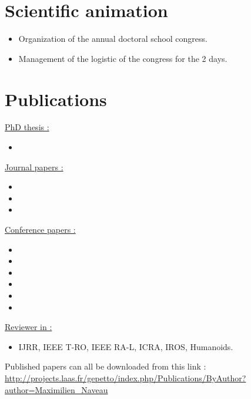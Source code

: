\documentclass[11pt,a4paper]{moderncv}
\newcommand{\items}{\item[*] \hspace{2mm}}
\begin{document}

\section{Scientific animation}

{
\begin{itemize}
\items Organization of the annual doctoral school congress.
\items Management of the logistic of the congress for the 2 days.
\end{itemize}
}


\section{Publications}

\large{\underline{PhD thesis :}}

\begin{itemize}%
\items {}
\end{itemize}

\large{\underline{Journal papers :}}

\begin{itemize}%
\items {}
\items {}
\items {}
\end{itemize}%


\large{\underline{Conference papers :}}

\begin{itemize}%
\items {}
\items {}
\items {}
\items {}
\items {}
\items {}
\end{itemize}


\large{\underline{Reviewer in :}}
\begin{itemize}%
\items IJRR, IEEE T-RO, IEEE RA-L, ICRA, IROS, Humanoids.
\end{itemize}

\vspace*{1cm}

Published papers can all be downloaded from this link :
\url{http://projects.laas.fr/gepetto/index.php/Publications/ByAuthor?author=Maximilien_Naveau}\\


\end{document}
